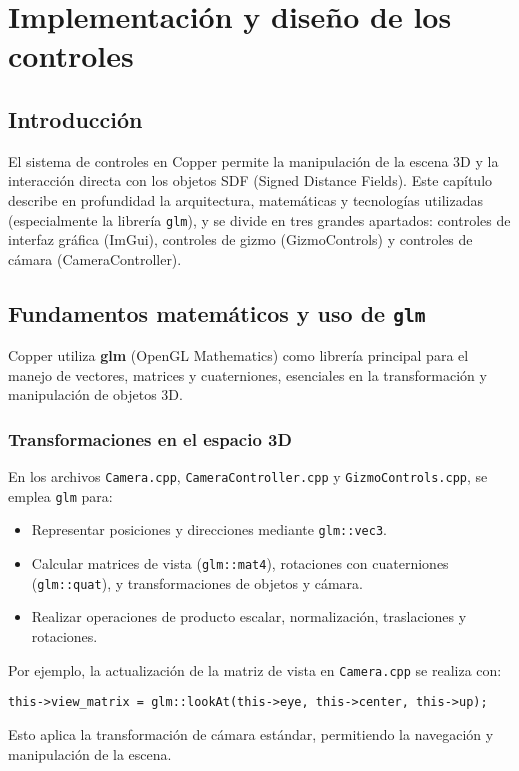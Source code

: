 \chapter{Implementación y diseño de los controles}

\section{Introducción}

El sistema de controles en Copper permite la manipulación de la escena 3D y la
interacción directa con los objetos SDF (Signed Distance Fields). Este capítulo
describe en profundidad la arquitectura, matemáticas y tecnologías utilizadas
(especialmente la librería \texttt{glm}), y se divide en tres grandes
apartados: controles de interfaz gráfica (ImGui), controles de gizmo
(GizmoControls) y controles de cámara (CameraController).

\section{Fundamentos matemáticos y uso de \texttt{glm}}

Copper utiliza \textbf{glm} (OpenGL Mathematics) como librería principal para
el manejo de vectores, matrices y cuaterniones, esenciales en la transformación
y manipulación de objetos 3D.

\subsection{Transformaciones en el espacio 3D}

En los archivos \texttt{Camera.cpp}, \texttt{CameraController.cpp} y
\texttt{GizmoControls.cpp}, se emplea \texttt{glm} para:
\begin{itemize}
    \item Representar posiciones y direcciones mediante \texttt{glm::vec3}.
    \item Calcular matrices de vista (\texttt{glm::mat4}), rotaciones con cuaterniones
          (\texttt{glm::quat}), y transformaciones de objetos y cámara.
    \item Realizar operaciones de producto escalar, normalización, traslaciones y
          rotaciones.
\end{itemize}
Por ejemplo, la actualización de la matriz de vista en \texttt{Camera.cpp} se realiza con:
\begin{verbatim}
this->view_matrix = glm::lookAt(this->eye, this->center, this->up);
\end{verbatim}
Esto aplica la transformación de cámara estándar, permitiendo la navegación y
manipulación de la escena.


